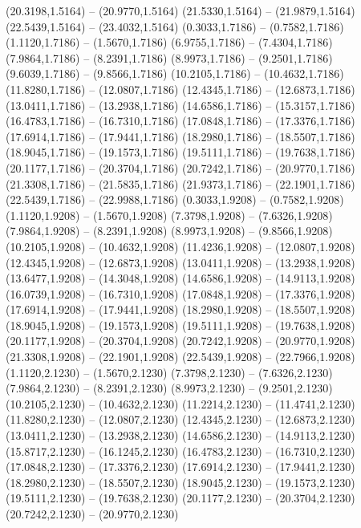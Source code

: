 {\begin{scope}[shift={(#1,#2)}]
    (20.3198,1.5164) -- (20.9770,1.5164)
    (21.5330,1.5164) -- (21.9879,1.5164)
    (22.5439,1.5164) -- (23.4032,1.5164)
    (0.3033,1.7186) -- (0.7582,1.7186)
    (1.1120,1.7186) -- (1.5670,1.7186)
    (6.9755,1.7186) -- (7.4304,1.7186)
    (7.9864,1.7186) -- (8.2391,1.7186)
    (8.9973,1.7186) -- (9.2501,1.7186)
    (9.6039,1.7186) -- (9.8566,1.7186)
    (10.2105,1.7186) -- (10.4632,1.7186)
    (11.8280,1.7186) -- (12.0807,1.7186)
    (12.4345,1.7186) -- (12.6873,1.7186)
    (13.0411,1.7186) -- (13.2938,1.7186)
    (14.6586,1.7186) -- (15.3157,1.7186)
    (16.4783,1.7186) -- (16.7310,1.7186)
    (17.0848,1.7186) -- (17.3376,1.7186)
    (17.6914,1.7186) -- (17.9441,1.7186)
    (18.2980,1.7186) -- (18.5507,1.7186)
    (18.9045,1.7186) -- (19.1573,1.7186)
    (19.5111,1.7186) -- (19.7638,1.7186)
    (20.1177,1.7186) -- (20.3704,1.7186)
    (20.7242,1.7186) -- (20.9770,1.7186)
    (21.3308,1.7186) -- (21.5835,1.7186)
    (21.9373,1.7186) -- (22.1901,1.7186)
    (22.5439,1.7186) -- (22.9988,1.7186)
    (0.3033,1.9208) -- (0.7582,1.9208)
    (1.1120,1.9208) -- (1.5670,1.9208)
    (7.3798,1.9208) -- (7.6326,1.9208)
    (7.9864,1.9208) -- (8.2391,1.9208)
    (8.9973,1.9208) -- (9.8566,1.9208)
    (10.2105,1.9208) -- (10.4632,1.9208)
    (11.4236,1.9208) -- (12.0807,1.9208)
    (12.4345,1.9208) -- (12.6873,1.9208)
    (13.0411,1.9208) -- (13.2938,1.9208)
    (13.6477,1.9208) -- (14.3048,1.9208)
    (14.6586,1.9208) -- (14.9113,1.9208)
    (16.0739,1.9208) -- (16.7310,1.9208)
    (17.0848,1.9208) -- (17.3376,1.9208)
    (17.6914,1.9208) -- (17.9441,1.9208)
    (18.2980,1.9208) -- (18.5507,1.9208)
    (18.9045,1.9208) -- (19.1573,1.9208)
    (19.5111,1.9208) -- (19.7638,1.9208)
    (20.1177,1.9208) -- (20.3704,1.9208)
    (20.7242,1.9208) -- (20.9770,1.9208)
    (21.3308,1.9208) -- (22.1901,1.9208)
    (22.5439,1.9208) -- (22.7966,1.9208)
    (1.1120,2.1230) -- (1.5670,2.1230)
    (7.3798,2.1230) -- (7.6326,2.1230)
    (7.9864,2.1230) -- (8.2391,2.1230)
    (8.9973,2.1230) -- (9.2501,2.1230)
    (10.2105,2.1230) -- (10.4632,2.1230)
    (11.2214,2.1230) -- (11.4741,2.1230)
    (11.8280,2.1230) -- (12.0807,2.1230)
    (12.4345,2.1230) -- (12.6873,2.1230)
    (13.0411,2.1230) -- (13.2938,2.1230)
    (14.6586,2.1230) -- (14.9113,2.1230)
    (15.8717,2.1230) -- (16.1245,2.1230)
    (16.4783,2.1230) -- (16.7310,2.1230)
    (17.0848,2.1230) -- (17.3376,2.1230)
    (17.6914,2.1230) -- (17.9441,2.1230)
    (18.2980,2.1230) -- (18.5507,2.1230)
    (18.9045,2.1230) -- (19.1573,2.1230)
    (19.5111,2.1230) -- (19.7638,2.1230)
    (20.1177,2.1230) -- (20.3704,2.1230)
    (20.7242,2.1230) -- (20.9770,2.1230)

\end{scope}}
